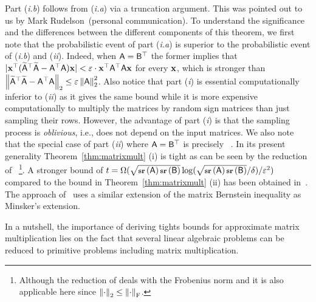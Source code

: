Part (\textit{i.b}) follows from (\textit{i.a}) via a truncation argument. This was pointed out to us by Mark Rudelson~(personal communication). To understand the significance and the differences between the different components of this theorem, we first note that the probabilistic event of part (\textit{i.a}) is superior to the probabilistic event of (\textit{i.b}) and (\textit{ii}). Indeed, when ${\mathsf{A} }={\mathsf{B} }^\top$ the former implies that $|\mathbf{x}^\top (\widetilde{{\mathsf{A} }}^\top \widetilde{{\mathsf{A} }} - {\mathsf{A} }^\top {\ensuremath{\mathsf{A} }}) \mathbf{x}| < \varepsilon \cdot \mathbf{x}^\top {\ensuremath{\mathsf{A} }}^\top {\ensuremath{\mathsf{A} }} \mathbf{x}$ for every $\mathbf{x}$, which is stronger than $\left\|\widetilde{{\mathsf{A} }}^\top \widetilde{{\mathsf{A} }} - {\mathsf{A} }^\top {\ensuremath{\mathsf{A} }}\right\|_2 \leq \varepsilon \left\|{\mathsf{A} }\right\|_2^2$. Also notice that part (\textit{i}) is essential computationally inferior to (\textit{ii}) as it gives the same bound while it is more expensive computationally to multiply the matrices by random sign matrices than just sampling their rows. However, the advantage of part (\textit{i}) is that the sampling process is \emph{oblivious}, i.e., does not depend on the input matrices. We also note that the special case of part (\textit{ii}) where ${\mathsf{A} }={\mathsf{B} }^\top$ is precisely ~\cite[Theorem~3.1]{lowrank:rankone:VR}. In its present generality Theorem~\ref{thm:matrixmult} (i) is tight as can be seen by the reduction of~\cite[Theorem~2.8]{CW_stoc09}
\footnote{Although the reduction of \cite{CW_stoc09} deals with the Frobenius norm and it is also applicable here since $\left\|\cdot\right\|_2 \leq  \left\|\cdot\right\|_{\textrm{F}}$.}. A stronger bound of $t=\Omega( \sqrt{\operatorname{\textbf{\footnotesize sr}}\left({\mathsf{A} }\right)\operatorname{\textbf{\footnotesize sr}}\left({\mathsf{B} }\right)} \log(\sqrt{\operatorname{\textbf{\footnotesize sr}}\left({\mathsf{A} }\right)\operatorname{\textbf{\footnotesize sr}}\left({\mathsf{B} }\right)}/\delta) /\varepsilon^2 )$ compared to the bound in Theorem~\ref{thm:matrixmult} (ii) has been obtained in~\cite{HKZ12}. The approach of~\cite{HKZ12} uses a similar extension of the matrix Bernstein inequality as Minsker's extension.
%

%
In a nutshell, the importance of deriving tights bounds for approximate matrix multiplication lies on the fact that several linear algebraic problems can be reduced to primitive problems including matrix multiplication.
%

%


